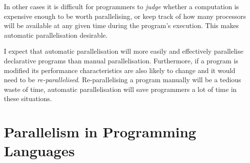 In other cases it is difficult for programmers to \emph{judge} whether
a computation is expensive enough to be worth parallelising,
or keep track of how many processors will be available at any given
time during the program's execution.
This makes automatic parallelisation desirable.

I expect that automatic parallelisation will more easily and
effectively parallelise declarative programs than manual
parallelisation.
Furthermore, if a program is modified its performance characteristics
are also likely to change and it would need to be
\emph{re-parallelised}.
Re-parallelising a program manually will be a tedious waste of time,
automatic parallelisation will save programmers a lot of time in these
situations.

\section{Parallelism in Programming Languages}
\label{sec:literature_review}


